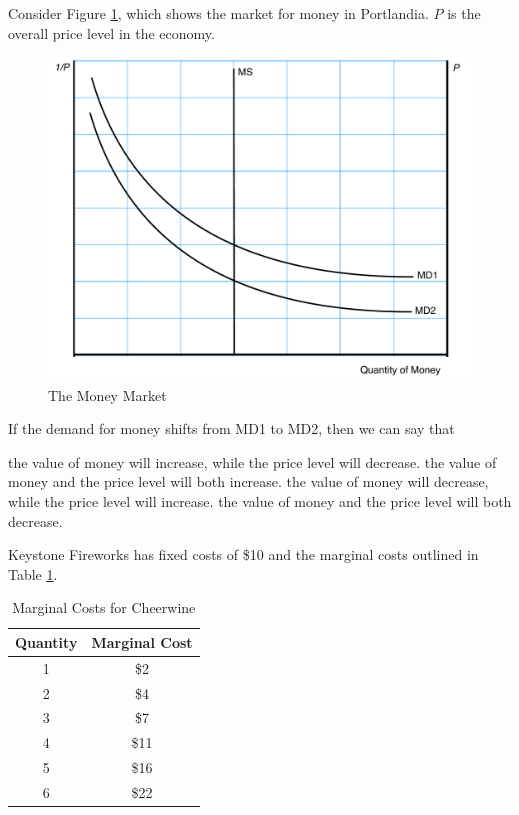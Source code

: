 \documentclass[addpoints,11pt]{exam}
\theoremstyle{definition}
\begin{document}
\begin{questions}
\question Consider Figure \ref{MC8}, which shows the market for money in Portlandia. $P$ is the overall price level in the economy.

\begin{figure}[H]
	\centering
	\includegraphics[scale=.40]{Final_MC8.pdf}
	\caption{The Money Market}
	\label{MC8}
\end{figure}

If the demand for money shifts from MD1 to MD2, then we can say that 

\begin{choices}
	\choice the value of money will increase, while the price level will decrease.
	\choice the value of money and the price level will both increase.
	\CorrectChoice the value of money will decrease, while the price level will increase.
	\choice the value of money and the price level will both decrease.
\end{choices}

\question Keystone Fireworks has fixed costs of \$10 and the marginal costs outlined in Table \ref{MC9}.

\begin{table}[ht]
	\caption{Marginal Costs for Cheerwine}
	\label{MC9}
	\centering
	\begin{tabular}{  c| c}   
		Quantity & Marginal Cost\\
		\hline
		1 & \$2 \\
		2 & \$4 \\
		3 & \$7 \\
		4 & \$11 \\
		5 & \$16 \\
		6 & \$22 \\
	\end{tabular}
\end{table}


\end{questions}
\end{document}
